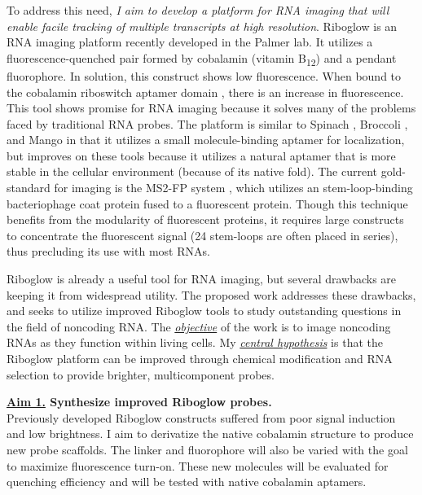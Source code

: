To address this need, \textit{I aim to develop a platform for RNA imaging that will enable facile tracking of multiple transcripts at high resolution}. Riboglow is an RNA imaging platform recently developed in the Palmer lab. It utilizes a fluorescence-quenched pair formed by cobalamin (vitamin B\textsubscript{12}) and a pendant fluorophore. In solution, this construct shows low fluorescence. When bound to the cobalamin riboswitch aptamer domain \cite{JohnsonJrB12cofactorsdirectly2012}, there is an increase in fluorescence. This tool shows promise for RNA imaging because it solves many of the problems faced by traditional RNA probes.
The platform is similar to Spinach \cite{PaigeRNAMimicsGreen2011}, Broccoli \cite{FilonovBroccoliRapidSelection2014}, and Mango \cite{AutourFluorogenicRNAMango2018,DolgosheinaRNAMangoAptamerFluorophore2014} in that it utilizes a small molecule-binding aptamer for localization, but improves on these tools because it utilizes a natural aptamer that is more stable in the cellular environment (because of its native fold).
The current gold-standard for imaging is the MS2-FP system \cite{FuscoSinglemRNAMolecules2003}, which utilizes an stem-loop-binding bacteriophage coat protein fused to a fluorescent protein. Though this technique benefits from the modularity of fluorescent proteins, it requires large constructs to concentrate the fluorescent signal (24 stem-loops are often placed in series), thus precluding its use with most RNAs.

Riboglow is already a useful tool for RNA imaging, but several drawbacks are keeping it from widespread utility. The proposed work addresses these drawbacks, and seeks to utilize improved Riboglow tools to study outstanding questions in the field of noncoding RNA. The \underline{\textit{objective}} of the work is to image noncoding RNAs as they function within living cells. My \underline{\textit{central hypothesis}} is that the Riboglow platform can be improved through chemical modification and RNA selection to provide brighter, multicomponent probes.

{\bf \underline{Aim 1.} Synthesize improved Riboglow probes.}\\
Previously developed Riboglow constructs suffered from poor signal induction and low brightness. I aim to derivatize the native cobalamin structure to produce new probe scaffolds. The linker and fluorophore will also be varied with the goal to maximize fluorescence turn-on. These new molecules will be evaluated for quenching efficiency and will be tested with native cobalamin aptamers.

